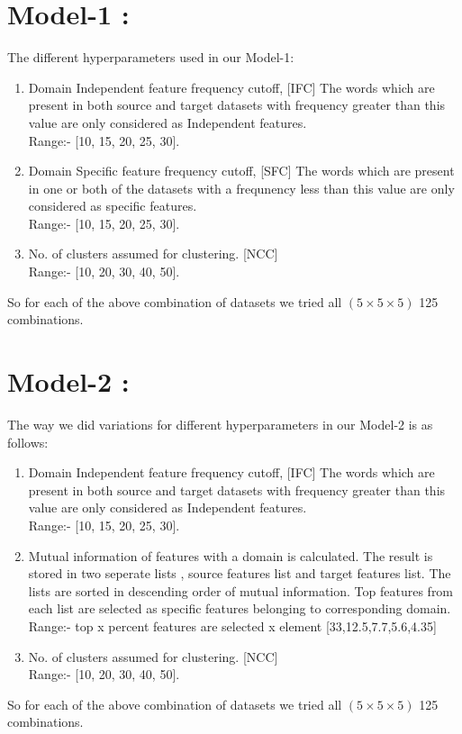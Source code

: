 \documentclass{report}
\begin{document}
\section{Model-1 :}
The different hyperparameters used in our Model-1:
\begin{enumerate}[label=\alph*.)]
\item Domain Independent feature frequency cutoff, [IFC] The words which are present in both source and target datasets with frequency greater than this value are only considered as Independent features.\\
Range:- [10, 15, 20, 25, 30].
\item Domain Specific feature frequency cutoff, [SFC] The words which are present in one or both of the datasets with a frequnency less than this value are only considered as specific features.\\
Range:- [10, 15, 20, 25, 30].
\item No. of clusters assumed for clustering. [NCC]\\
Range:- [10, 20, 30, 40, 50].
\end{enumerate}
So for each of the above combination of datasets we tried all \((5\times 5\times 5)\) 125
combinations.
\section{Model-2 :}
The way we did variations for different hyperparameters in our Model-2 is as follows:
\begin{enumerate}[label=\alph*.)]
\item Domain Independent feature frequency cutoff, [IFC] The words which are present in both source and target datasets with frequency greater than this value are only considered as Independent features.\\
Range:- [10, 15, 20, 25, 30].
\item Mutual information of features with a domain is calculated. The result is stored in two seperate lists , source features list and target features list. The lists are sorted in descending order of mutual information. Top features from each list are selected as specific features belonging to corresponding domain.\\
Range:- top x percent features are selected x element [33,12.5,7.7,5.6,4.35]
\item No. of clusters assumed for clustering. [NCC]\\
Range:- [10, 20, 30, 40, 50].
\end{enumerate}
So for each of the above combination of datasets we tried all \((5\times 5\times 5)\) 125
combinations.
\end{document}
